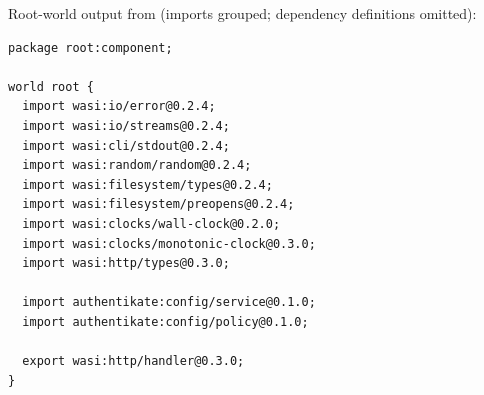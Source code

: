 \begin{minipage}{\linewidth}
\footnotesize
Root-world output from
(imports grouped; dependency definitions omitted):
\begin{verbatim}
package root:component;

world root {
  import wasi:io/error@0.2.4;
  import wasi:io/streams@0.2.4;
  import wasi:cli/stdout@0.2.4;
  import wasi:random/random@0.2.4;
  import wasi:filesystem/types@0.2.4;
  import wasi:filesystem/preopens@0.2.4;
  import wasi:clocks/wall-clock@0.2.0;
  import wasi:clocks/monotonic-clock@0.3.0;
  import wasi:http/types@0.3.0;

  import authentikate:config/service@0.1.0;
  import authentikate:config/policy@0.1.0;

  export wasi:http/handler@0.3.0;
}
\end{verbatim}
\end{minipage}
